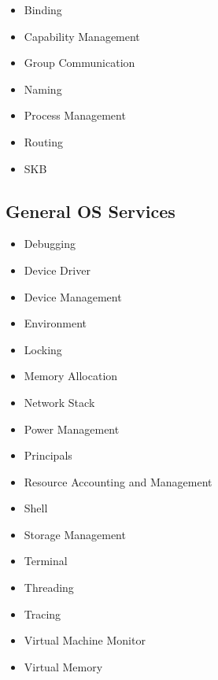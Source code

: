\documentclass[a4paper,twoside]{report} %
\begin{document}
\begin{itemize}
  \item Binding
  \item Capability Management
  \item Group Communication
  \item Naming
  \item Process Management
  \item Routing
  \item SKB
\end{itemize}

\subsection{General OS Services}

\begin{itemize}
  \item Debugging
  \item Device Driver
  \item Device Management
  \item Environment
  \item Locking
  \item Memory Allocation
  \item Network Stack
  \item Power Management
  \item Principals
  \item Resource Accounting and Management
  \item Shell
  \item Storage Management
  \item Terminal
  \item Threading
  \item Tracing
  \item Virtual Machine Monitor
  \item Virtual Memory
\end{itemize}
\end{document}
